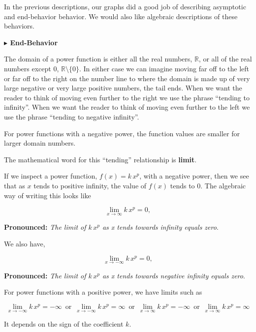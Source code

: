 \documentclass{ximera}
\begin{document}
In the previous descriptions, our graphs did a good job of describing asymptotic and end-behavior behavior.  We would also like algebraic descriptions of these behaviors. 


\textbf{\textcolor{blue!55!black}{$\blacktriangleright$  \textbf{End-Behavior}}} 

The domain of a power function is either all the real numbers, $\mathbb{R}$, or all of the real numbers except $0$, $\mathbb{R} \setminus \{ 0 \}$.  In either case we can imagine moving far off to the left or far off to the right on the number line to where the domain is made up of very large negative or very large positive numbers, the tail ends.  When we want the reader to think of moving even further to the right we use the phrase ``tending to infinity''. When we want the reader to think of moving even further to the left we use the phrase ``tending to negative infinity''.

For power functions with a negative power, the function values are smaller for larger domain numbers.

The mathematical word for this ``tending'' relationship is \textbf{\textcolor{purple!85!blue}{limit}}.

If we inspect a power function, $f(x) = k \, x^p$, with a negative power, then we see that as $x$ tends to positive infinity, the value of $f(x)$ tends to $0$.  The algebraic way of writing this looks like


\[    \lim_{x \to \infty} k \, x^p = 0,        \]


\textbf{\textcolor{purple!85!blue}{Pronounced:}} \textit{The limit of $k \, x^p$ as x tends towards infinity equals zero}.


We also have,

\[    \lim_{x \to -\infty} k \, x^p = 0,        \]


\textbf{\textcolor{purple!85!blue}{Pronounced:}} \textit{The limit of $k \, x^p$ as x tends towards negative infinity equals zero}.


For power functions with a positive power, we have limits such as 



\[    \lim_{x \to -\infty} k \, x^p =  -\infty  \,   \text{ or }  \,  \lim_{x \to -\infty} k \, x^p =  \infty  \,   \text{ or }  \,     \lim_{x \to \infty} k \, x^p = -\infty  \,  \text{ or }  \,     \lim_{x \to \infty} k \, x^p = \infty  \]




It depends on the sign of the coefficient $k$.
\end{document}
